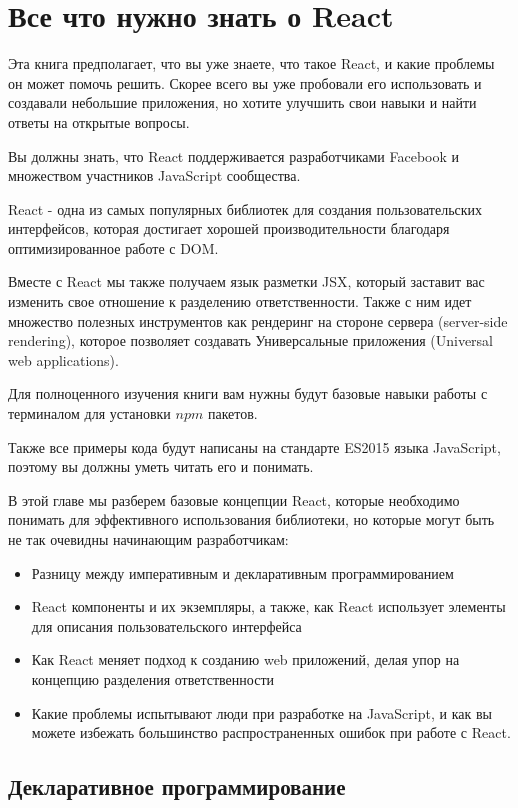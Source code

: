 \chapter{Все что нужно знать о React}

Эта книга предполагает, что вы уже знаете, что такое React, и какие проблемы он может помочь решить. Скорее всего вы уже пробовали его использовать и создавали небольшие приложения, но хотите улучшить свои навыки и найти ответы на открытые вопросы.

Вы должны знать, что React поддерживается разработчиками Facebook и множеством участников JavaScript сообщества.

React - одна из самых популярных библиотек для создания пользовательских интерфейсов, которая достигает хорошей производительности благодаря оптимизированное работе с DOM.

Вместе с React мы также получаем язык разметки JSX, который заставит вас изменить свое отношение к разделению ответственности. Также с ним идет множество полезных инструментов как рендеринг на стороне сервера (server-side rendering), которое позволяет создавать Универсальные приложения (Universal web applications).

Для полноценного изучения книги вам нужны будут базовые навыки работы с терминалом для установки $npm$ пакетов.

Также все примеры кода будут написаны на стандарте ES2015 языка JavaScript, поэтому вы должны уметь читать его и понимать.

В этой главе мы разберем базовые концепции React, которые необходимо понимать для эффективного использования библиотеки, но которые могут быть не так очевидны начинающим разработчикам:

\begin{itemize}
  \item Разницу между императивным и декларативным программированием
  \item React компоненты и их экземпляры, а также, как React использует элементы для описания пользовательского интерфейса
  \item Как React меняет подход к созданию web приложений, делая упор на концепцию разделения ответственности
  \item Какие проблемы испытывают люди при разработке на JavaScript, и как вы можете избежать большинство распространенных ошибок при работе с React.
\end{itemize}


\section{Декларативное программирование}

